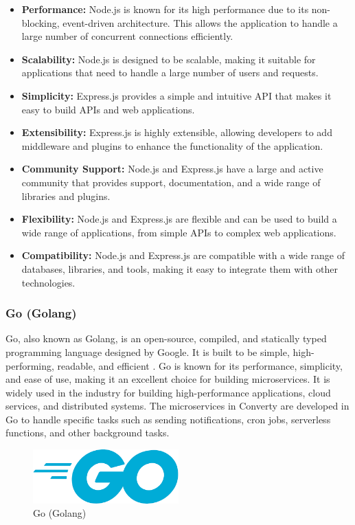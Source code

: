\begin{itemize}
    \item \textbf{Performance:} Node.js is known for its high performance due to its non-blocking, event-driven architecture. This allows the application to handle a large number of concurrent connections efficiently.
    \item \textbf{Scalability:} Node.js is designed to be scalable, making it suitable for applications that need to handle a large number of users and requests.
    \item \textbf{Simplicity:} Express.js provides a simple and intuitive API that makes it easy to build APIs and web applications.
    \item \textbf{Extensibility:} Express.js is highly extensible, allowing developers to add middleware and plugins to enhance the functionality of the application.
    \item \textbf{Community Support:} Node.js and Express.js have a large and active community that provides support, documentation, and a wide range of libraries and plugins.
    \item \textbf{Flexibility:} Node.js and Express.js are flexible and can be used to build a wide range of applications, from simple APIs to complex web applications.
    \item \textbf{Compatibility:} Node.js and Express.js are compatible with a wide range of databases, libraries, and tools, making it easy to integrate them with other technologies.
\end{itemize}

\subsubsection{Go (Golang)}
Go, also known as Golang, is an open-source, compiled, and statically typed programming language designed by Google. It is built to be simple, high-performing, readable, and efficient \cite{golang}. Go is known for its performance, simplicity, and ease of use, making it an excellent choice for building microservices. It is widely used in the industry for building high-performance applications, cloud services, and distributed systems. The microservices in Converty are developed in Go to handle specific tasks such as sending notifications, cron jobs, serverless functions, and other background tasks.

\begin{figure}[H]
    \centering
    \includegraphics[width=0.5\textwidth]{Images/golang2.png}
    \caption{Go (Golang)}
    \label{fig:golang}
\end{figure}

